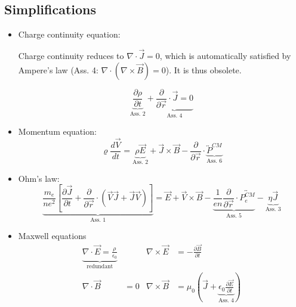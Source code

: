 \subsection{Simplifications}
\label{subsec: simplifications}


\begin{itemize}


\item Charge continuity equation:

Charge continuity reduces to $\nabla \cdot \vec{J} = 0$, which is automatically 
satisfied by Ampere's law (Ass. 4: $\nabla \cdot (\nabla \times \vec{B}) = 0$). It is thus obsolete.

\[
\underbrace{\frac{\partial \rho}{\partial t}}_{\text{Ass. 2}} + \underbrace{\frac{\partial}{\partial \vec{r}} \cdot \vec{J} = 0}_{\text{Ass. 4}}
\]

\item Momentum equation:
\[
\varrho \frac{d\vec{V}}{dt} = \underbrace{\rho \vec{E}}_{\text{Ass. 2}} + \vec{J} \times \vec{B} - \frac{\partial}{\partial \vec{r}} \cdot \underbrace{\overleftrightarrow{P}^{CM}}_{\text{Ass. 6}}
\]

\item Ohm's law:
\[
\underbrace{\frac{m_e}{n e^2} \left[\frac{\partial \vec{J}}{\partial t} + \frac{\partial}{\partial \vec{r}} \cdot (\vec{V}\vec{J} + \vec{J}\vec{V})\right]}_{\text{Ass. 1}} = \vec{E} + \vec{V} \times \vec{B} - \underbrace{\frac{1}{en} \frac{\partial}{\partial \vec{r}} \cdot \overleftrightarrow{P^{CM}_e}}_{\text{Ass. 5}}- \underbrace{\eta \vec{J}}_{\text{Ass. 3}}
\]
\end{itemize}



\begin{itemize}

\item Maxwell equations
\begin{align*}
\underbrace{\nabla \cdot \vec{E} = \frac{\rho}{\epsilon_0}}_{\text{redundant}} & & \nabla \times \vec{E} &= -\frac{\partial \vec{B}}{\partial t} \\
\nabla \cdot \vec{B} &= 0 & \nabla \times \vec{B} &= \mu_0 \left(\vec{J} + \underbrace{\epsilon_0 \frac{\partial \vec{E}}{\partial t}}_{\text{Ass. 4}}\right)
\end{align*}
\end{itemize}





